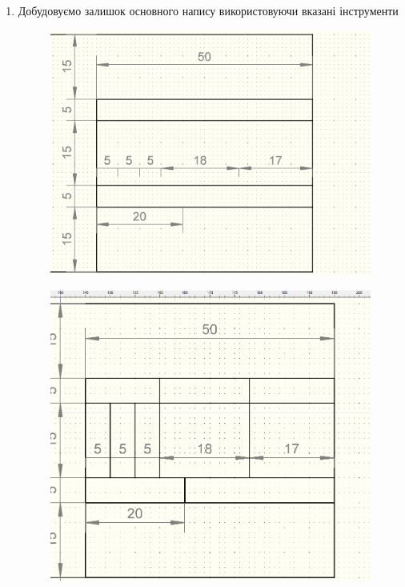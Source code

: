 \begin{enumerate}[leftmargin=*]
\item Добудовуємо залишок основного напису використовуючи вказані інструменти
  \begin{figure}[!htb]
    \centering \includegraphics[width=0.9\linewidth]{./images/lab2/fifth_step.png}
    \caption{ \label{fig:lab2:fifth_step}}
  \end{figure}
  \begin{figure}[!htb]
    \centering \includegraphics[width=0.9\linewidth]{./images/lab2/sixth_step.png}
    \caption{}
    \label{fig:lab2:sixth_step} 
  \end{figure}
  \begin{figure}[!htb]

\end{figure}
\end{enumerate}

